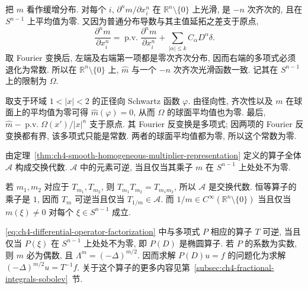 \begin{Proof}
把 $m$ 看作缓增分布. 对每个 $i$, $\partial^nm/\partial x_i^n$ 在 $\mathbb R^n\setminus\{0\}$ 上光滑, 是 $-n$ 次齐次的, 且在 $S^{n-1}$ 上平均值为零. 又因为普通分布导数与其主值延拓之差支于原点,
\[
 \frac{\partial^nm}{\partial x_i^n}
 =\operatorname{p.v.}\frac{\partial^nm}{\partial x_i^n}
 +\sum_{|\alpha|\le k}C_\alpha D^\alpha\delta.
\]
取 Fourier 变换后, 左端及右端第一项都是零次齐次分布, 因而右端的多项式必须退化为常数. 所以在 $\mathbb R^n\setminus\{0\}$ 上, $\widehat m$ 与一个 $-n$ 次齐次光滑函数一致. 记其在 $S^{n-1}$ 上的限制为 $\Omega$.

取支于环域 $1<|x|<2$ 的正径向 Schwartz 函数 $\varphi$. 由径向性, 齐次性以及 $m$ 在球面上的平均值为零可得 $\widehat m(\varphi)=0$, 从而 $\Omega$ 的球面平均值也为零. 最后, $\widehat m-\operatorname{p.v.}\Omega(x')/|x|^n$ 支于原点. 其 Fourier 反变换是多项式; 因两项的 Fourier 反变换都有界, 该多项式只能是常数. 两者的球面平均值都为零, 所以这个常数为零.
\end{Proof}

\hypertarget{chapter-04-page-094}{}
\begin{Theorem}
\label{thm:ch4-singular-integral-operator-algebra}
由定理~\ref{thm:ch4-smooth-homogeneous-multiplier-representation} 定义的算子全体 $\mathcal A$ 构成交换代数. $\mathcal A$ 中的元素可逆, 当且仅当其乘子 $m$ 在 $S^{n-1}$ 上处处不为零.
\end{Theorem}

\begin{Proof}
若 $m_1,m_2$ 对应于 $T_{m_1},T_{m_2}$, 则 $T_{m_1}T_{m_2}=T_{m_1m_2}$, 所以 $\mathcal A$ 是交换代数. 恒等算子的乘子是 $1$, 因而 $T_m$ 可逆当且仅当 $T_{1/m}\in\mathcal A$. 而 $1/m\in C^\infty(\mathbb R^n\setminus\{0\})$ 当且仅当 $m(\xi)\ne0$ 对每个 $\xi\in S^{n-1}$ 成立.
\end{Proof}

\eqref{eq:ch4-differential-operator-factorization} 中与多项式 $P$ 相应的算子 $T$ 可逆, 当且仅当 $P(\xi)$ 在 $S^{n-1}$ 上处处不为零, 即 $P(D)$ 是椭圆算子. 若 $P$ 的系数为实数, 则 $m$ 必为偶数, 且 $\Lambda^m=(-\Delta)^{m/2}$. 因而求解 $P(D)u=f$ 的问题化为求解 $(-\Delta)^{m/2}u=T^{-1}f$. 关于这个算子的更多内容见第~\ref{subsec:ch4-fractional-integrals-sobolev}~节.
